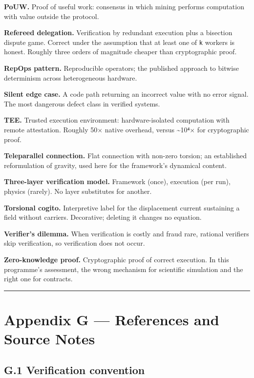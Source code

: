 \documentclass[
  11pt]{report}
\begin{document}
\textbf{PoUW.} Proof of useful work: consensus in which mining performs
computation with value outside the protocol.

\textbf{Refereed delegation.} Verification by redundant execution plus a
bisection dispute game. Correct under the assumption that at least one
of \texttt{k} workers is honest. Roughly three orders of magnitude
cheaper than cryptographic proof.

\textbf{RepOps pattern.} Reproducible operators; the published approach
to bitwise determinism across heterogeneous hardware.

\textbf{Silent edge case.} A code path returning an incorrect value with
no error signal. The most dangerous defect class in verified systems.

\textbf{TEE.} Trusted execution environment: hardware-isolated
computation with remote attestation. Roughly 50× native overhead, versus
\textasciitilde10⁴× for cryptographic proof.

\textbf{Teleparallel connection.} Flat connection with non-zero torsion;
an established reformulation of gravity, used here for the framework's
dynamical content.

\textbf{Three-layer verification model.} Framework (once), execution
(per run), physics (rarely). No layer substitutes for another.

\textbf{Torsional cogito.} Interpretive label for the displacement
current sustaining a field without carriers. Decorative; deleting it
changes no equation.

\textbf{Verifier's dilemma.} When verification is costly and fraud rare,
rational verifiers skip verification, so verification does not occur.

\textbf{Zero-knowledge proof.} Cryptographic proof of correct execution.
In this programme's assessment, the wrong mechanism for scientific
simulation and the right one for contracts.

\begin{center}\rule{0.5\linewidth}{0.5pt}\end{center}

\hypertarget{appendix-g-references-and-source-notes}{%
\chapter{Appendix G --- References and Source
Notes}\label{appendix-g-references-and-source-notes}}

\hypertarget{g.1-verification-convention}{%
\section{G.1 Verification
convention}\label{g.1-verification-convention}}
\end{document}

